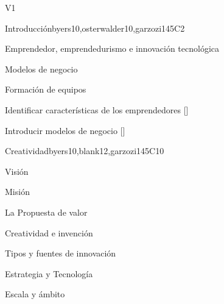 \begin{syllabus}
\begin{competences}{V1}
\end{competences}



\begin{unit}{}{Introducción}{byers10,osterwalder10,garzozi14}{5}{C2}
\begin{topics}
      \item Emprendedor, emprendedurismo e innovación tecnológica
      \item Modelos de negocio
      \item Formación de equipos
   \end{topics}

    \begin{learningoutcomes} 
      \item Identificar características de los emprendedores  [\Familiarity]
      \item Introducir modelos de negocio  [\Familiarity]
    \end{learningoutcomes} 
\end{unit}

\begin{unit}{}{Creatividad}{byers10,blank12,garzozi14}{5}{C10}
\begin{topics}
      \item Visión
      \item Misión
      \item La Propuesta de valor
      \item Creatividad e invención
      \item Tipos y fuentes de innovación
      \item Estrategia y Tecnología
      \item Escala y ámbito
   \end{topics}


\end{unit}
\end{syllabus}
